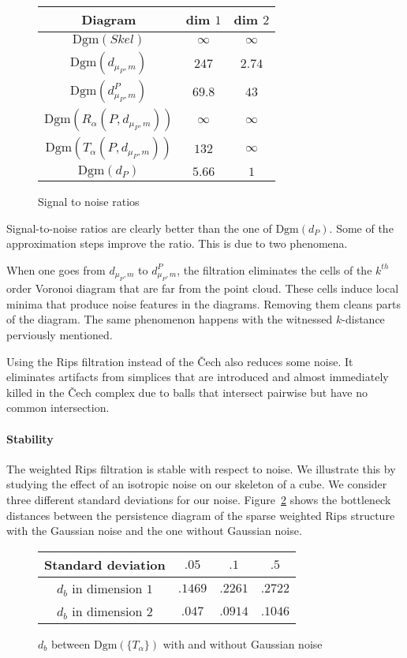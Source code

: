 \documentclass[a4paper]{article}
\newcommand\dmP{d_{\mu_P,m}}
\newcommand\dPP{d_{\mu_P,m}^P}
\newcommand\Dgm[1]{\mathrm{Dgm}(#1)}
\begin{document}
\begin{figure}[!ht]
\centering
\begin{tabular}{|c|c|c|}
\hline
Diagram & dim $1$ & dim $2$ \\
\hline
$\Dgm{Skel}$ & $\infty$ & $\infty$ \\
$\Dgm{\dmP}$ & $247$ &  $2.74$ \\
$\Dgm{\dPP}$ & $69.8$ & $43$ \\
$\Dgm{R_\alpha(P,\dmP)}$ & $\infty$ & $\infty$ \\
$\Dgm{T_\alpha(P,\dmP)}$ & $132$ & $\infty$ \\
$\Dgm{d_P}$ & $5.66$ & $1$ \\
\hline
\end{tabular}
\caption{Signal to noise ratios}\label{fRatio}
\end{figure}

Signal-to-noise ratios are clearly better than the one of $\Dgm{d_P}$.
Some of the approximation steps improve the ratio.
This is due to two phenomena.

When one goes from $\dmP$ to $\dPP$, the filtration eliminates the cells of the $k^{th}$ order Voronoi diagram that are far from the point cloud.
These cells induce local minima that produce noise features in the diagrams.
Removing them cleans parts of the diagram.
The same phenomenon happens with the witnessed $k$-distance perviously mentioned.

Using the Rips filtration instead of the \v{C}ech also reduces some noise.
It eliminates artifacts from simplices that are introduced and almost immediately killed in the \v{C}ech complex due to balls that intersect pairwise but have no common intersection.

\paragraph{Stability\\}

The weighted Rips filtration is stable with respect to noise. 
We illustrate this by studying the effect of an isotropic noise on our skeleton of a cube. 
We consider three different standard deviations for our noise.
Figure~\ref{fGauss} shows the bottleneck distances between the persistence diagram of the sparse weighted Rips structure with the Gaussian noise and the one without Gaussian noise.

\begin{figure}[!ht]
\centering
\begin{tabular}{|c|c|c|c|}
\hline
Standard deviation & $.05$ & $.1$ & $.5$ \\
\hline
$d_b$ in dimension $1$ & $.1469$ & $.2261$ & $.2722$ \\
$d_b$ in dimension $2$ & $.047$ & $.0914$ & $.1046$ \\
\hline
\end{tabular}
\caption{$d_b$ between $\Dgm{\{T_\alpha\}}$ with and without Gaussian noise}\label{fGauss}
\end{figure}
\end{document}
